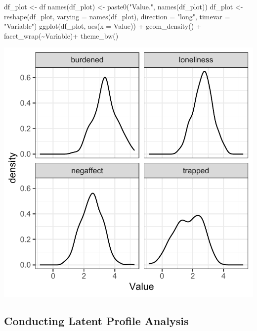 \documentclass[
  man,floatsintext]{apa6}
\newenvironment{Shaded}{\begin{snugshade}}{\end{snugshade}}
\newcommand{\AttributeTok}[1]{\textcolor[rgb]{0.77,0.63,0.00}{#1}}
\newcommand{\FunctionTok}[1]{\textcolor[rgb]{0.00,0.00,0.00}{#1}}
\newcommand{\NormalTok}[1]{#1}
\newcommand{\OtherTok}[1]{\textcolor[rgb]{0.56,0.35,0.01}{#1}}
\newcommand{\SpecialCharTok}[1]{\textcolor[rgb]{0.00,0.00,0.00}{#1}}
\newcommand{\StringTok}[1]{\textcolor[rgb]{0.31,0.60,0.02}{#1}}
\begin{document}
\begin{Shaded}
\begin{Highlighting}[]
\NormalTok{df\_plot }\OtherTok{\textless{}{-}}\NormalTok{ df}
\FunctionTok{names}\NormalTok{(df\_plot) }\OtherTok{\textless{}{-}} \FunctionTok{paste0}\NormalTok{(}\StringTok{"Value."}\NormalTok{, }\FunctionTok{names}\NormalTok{(df\_plot))}
\NormalTok{df\_plot }\OtherTok{\textless{}{-}} \FunctionTok{reshape}\NormalTok{(df\_plot, }\AttributeTok{varying =} \FunctionTok{names}\NormalTok{(df\_plot), }\AttributeTok{direction =} \StringTok{"long"}\NormalTok{,}
                   \AttributeTok{timevar =} \StringTok{"Variable"}\NormalTok{)}
\FunctionTok{ggplot}\NormalTok{(df\_plot, }\FunctionTok{aes}\NormalTok{(}\AttributeTok{x =}\NormalTok{ Value)) }\SpecialCharTok{+}
  \FunctionTok{geom\_density}\NormalTok{() }\SpecialCharTok{+}
  \FunctionTok{facet\_wrap}\NormalTok{(}\SpecialCharTok{\textasciitilde{}}\NormalTok{Variable)}\SpecialCharTok{+}
  \FunctionTok{theme\_bw}\NormalTok{()}
\end{Highlighting}
\end{Shaded}

\includegraphics{appendices/plot_lpa_desc.pdf}

\hypertarget{conducting-latent-profile-analysis}{%
\subsection{Conducting Latent Profile Analysis}\label{conducting-latent-profile-analysis}}
\end{document}
